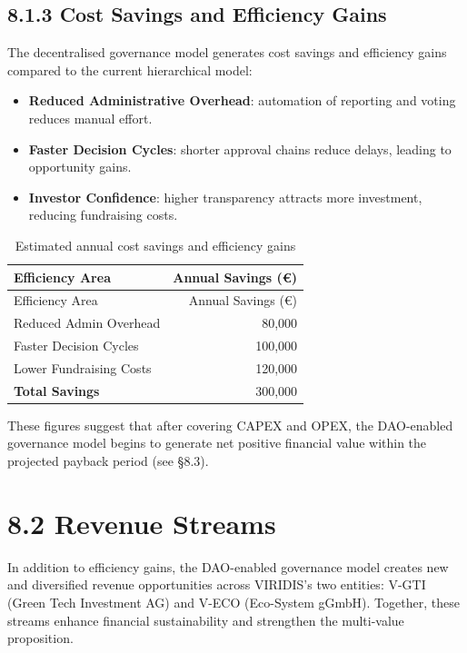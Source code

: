 \documentclass[
  english,
  12pt,
  oneside,
  open=any]{scrbook}
\providecommand{\tightlist}{%
  \setlength{\itemsep}{0pt}\setlength{\parskip}{0pt}}\usepackage{longtable,booktabs,array}
\begin{document}
\subsection{8.1.3 Cost Savings and Efficiency Gains}\label{sec-savings}

The decentralised governance model generates cost savings and efficiency
gains compared to the current hierarchical model:

\begin{itemize}
\tightlist
\item
  \textbf{Reduced Administrative Overhead}: automation of reporting and
  voting reduces manual effort.\\
\item
  \textbf{Faster Decision Cycles}: shorter approval chains reduce
  delays, leading to opportunity gains.\\
\item
  \textbf{Investor Confidence}: higher transparency attracts more
  investment, reducing fundraising costs.
\end{itemize}

\begin{longtable}[]{@{}lr@{}}
\caption{Estimated annual cost savings and efficiency
gains}\label{tbl-savings}\tabularnewline
\toprule\noalign{}
Efficiency Area & Annual Savings (€) \\
\midrule\noalign{}
\endfirsthead
\toprule\noalign{}
Efficiency Area & Annual Savings (€) \\
\midrule\noalign{}
\endhead
\bottomrule\noalign{}
\endlastfoot
Reduced Admin Overhead & 80,000 \\
Faster Decision Cycles & 100,000 \\
Lower Fundraising Costs & 120,000 \\
\textbf{Total Savings} & 300,000 \\
\end{longtable}

These figures suggest that after covering CAPEX and OPEX, the
DAO-enabled governance model begins to generate net positive financial
value within the projected payback period (see §8.3).

\section{8.2 Revenue Streams}\label{sec-revenue}

In addition to efficiency gains, the DAO-enabled governance model
creates new and diversified revenue opportunities across VIRIDIS's two
entities: V-GTI (Green Tech Investment AG) and V-ECO (Eco-System gGmbH).
Together, these streams enhance financial sustainability and strengthen
the multi-value proposition.
\end{document}
